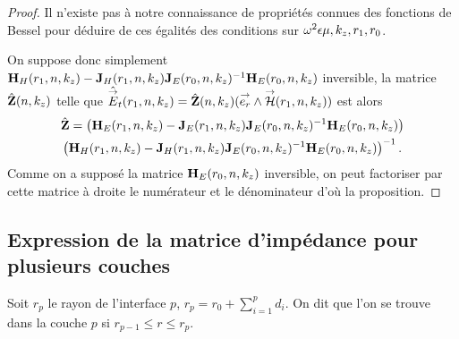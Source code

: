 \begin{proof}
      Il n'existe pas à notre connaissance de propriétés connues des fonctions de Bessel pour déduire de ces égalités des conditions sur \(\omega^2\eps\mu,k_z,r_1,r_0\).

      On suppose donc simplement \(\mH_{H}(r_1,n,k_z) - \mJ_{H}(r_1,n,k_z)\mJ_{E}(r_0,n,k_z)^{-1}\mH_{E}(r_0,n,k_z)\) inversible, la matrice \(\hat\mZ(n,k_z)\) telle que \(\hat\vE_t(r_1,n,k_z) = \hat\mZ(n,k_z) (\vect{e_r}\pvect\vH(r_1,n,k_z))\) est alors
      \begin{multline*}
        \hat \mZ =
        \left(\mH_{E}(r_1,n,k_z) - \mJ_{E}(r_1,n,k_z)\mJ_{E}(r_0,n,k_z)^{-1}\mH_{E}(r_0,n,k_z)\right)
        \\
        \left(\mH_{H}(r_1,n,k_z) - \mJ_{H}(r_1,n,k_z)\mJ_{E}(r_0,n,k_z)^{-1}\mH_{E}(r_0,n,k_z)\right)^{-1}.
      \end{multline*}
      Comme on a supposé la matrice \(\mH_E(r_0,n,k_z)\) inversible, on peut factoriser par cette matrice à droite le numérateur et le dénominateur d'où la proposition.

    \end{proof}


  \subsection{Expression de la matrice d'impédance pour plusieurs couches}

    \begin{figure}[!hbt]
      \centering
      \begin{tikzpicture}
        
      \end{tikzpicture}
    \end{figure}

    Soit \(r_p\) le rayon de l'interface \(p\), \(r_p = r_0 +\sum_{i=1}^{p} d_{i}\). On dit que l'on se trouve dans la couche \(p\) si \(r_{p-1} \le r \le r_p \).

